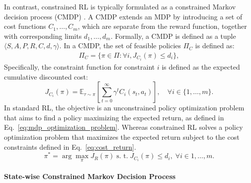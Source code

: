 In contrast, constrained RL is typically formulated as a constrained Markov decision process (CMDP) \cite{altman2021constrained}. A CMDP extends an MDP by introducing a set of cost functions $C_1, \ldots, C_m$, which are separate from the reward function, together with corresponding limits $d_1, \ldots, d_m$.
Formally, a CMDP is defined as a tuple $\langle S, A, P, R, C, d, \gamma \rangle$.
In a CMDP, the set of feasible policies $\Pi_C$ is defined as:
\begin{equation} \label{eq:feasible_policy_set_cmdp}
    \begin{aligned}
        \Pi_C = \{ \pi \in \Pi: \forall i, J_{C_i}(\pi) \leq d_i \},
    \end{aligned}
\end{equation}
Specifically, the constraint function for constraint $i$ is defined as the expected cumulative discounted cost:
\begin{equation} \label{eq:cost_return}
    J_{C_i}(\pi) = \mathbb{E}_{\tau \sim \pi}\!\left[\sum^\infty_{t = 0} \gamma^t C_i(s_t, a_t)\right], 
    \quad \forall i \in \{1, \ldots, m\}.
\end{equation}
In standard RL, the objective is an unconstrained policy optimization problem that aims to find a policy maximizing the expected return, as defined in Eq.~\eqref{eq:mdp_optimization_problem}.
Whereas constrained RL solves a policy optimization problem that maximizes the expected return subject to the cost constraints defined in Eq.~\eqref{eq:cost_return}.
\begin{equation} \label{eq:cmdp_optimization_problem}
    \pi^* = \arg\max_\pi J_R(\pi) \; \text{s. t.} \; J_{C_i}(\pi) \leq d_i, \; \forall i \in {1, \ldots, m}.
\end{equation}


\paragraph{State-wise Constrained Markov Decision Process}

